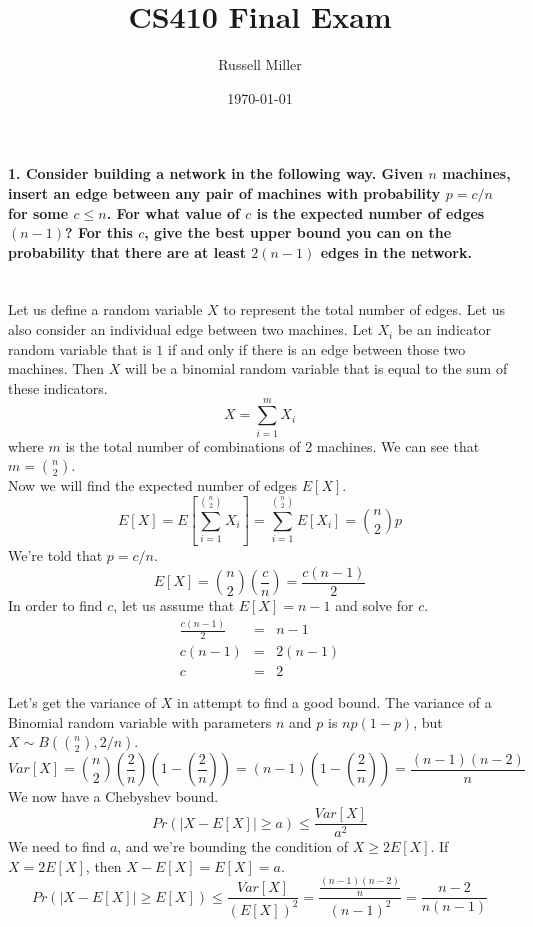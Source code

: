 \documentclass{article}
\title{CS410 Final Exam}
\author{Russell Miller}
\date{\today}
\begin{document}
\maketitle

\paragraph{1. Consider building a network in the following way. Given $n$ 
machines, insert an edge between any pair of machines with probability $p = 
c/n$ for some $c \leq n$. For what value of $c$ is the expected number of edges 
$(n - 1)$? For this $c$, give the best upper bound you can on the probability 
that there are at least $2(n - 1)$ edges in the network.\\\\}

Let us define a random variable $X$ to represent the total number of edges. Let 
us also consider an individual edge between two machines. Let $X_i$ be an 
indicator random variable that is $1$ if and only if there is an edge between 
those two machines. Then $X$ will be a binomial random variable that is equal 
to the sum of these indicators.
\begin{equation*}
X = \sum_{i=1}^m X_i
\end{equation*}
where $m$ is the total number of combinations of 2 machines. We can see that $m 
= {n\choose 2}$.\\
Now we will find the expected number of edges $E[X]$.
\begin{equation*}
E[X] = E[\sum_{i=1}^{n\choose 2} X_i] = \sum_{i=1}^{n\choose 2} E[X_i] = 
{n\choose 2}p
\end{equation*}
We're told that $p=c/n$.
\begin{equation*}
E[X] = {n\choose 2}\left(\frac{c}{n}\right) = \frac{c(n-1)}{2}
\end{equation*}
In order to find $c$, let us assume that $E[X] = n-1$ and solve for $c$.
\begin{eqnarray*}
\frac{c(n-1)}{2} & = & n-1\\
c(n-1) & = & 2(n-1)\\
c & = & 2
\end{eqnarray*}

Let's get the variance of $X$ in attempt to find a good bound. The variance of 
a Binomial random variable with parameters $n$ and $p$ is $np(1-p)$, but $X\sim 
B({n\choose 2},2/n)$.
\begin{equation*}
Var[X] = {n\choose 2}\left(\frac{2}{n}\right)(1-\left(\frac{2}{n}\right)) = 
	(n-1)(1-\left(\frac{2}{n}\right)) = \frac{(n-1)(n-2)}{n}
\end{equation*}
We now have a Chebyshev bound.
\begin{equation*}
Pr(|X-E[X]|\geq a) \leq \frac{Var[X]}{a^2}
\end{equation*}
We need to find $a$, and we're bounding the condition of $X \geq 2E[X]$. If 
$X=2E[X]$, then $X-E[X] = E[X] = a$.
\begin{equation*}
Pr(|X-E[X]| \geq E[X]) \leq \frac{Var[X]}{(E[X])^2} = 
\frac{\frac{(n-1)(n-2)}{n}}{(n-1)^2} = \frac{n-2}{n(n-1)}
\end{equation*}
\end{document}

